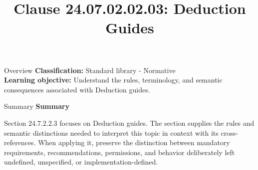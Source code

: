 \documentclass[10pt,letterpaper]{article}
\title{Clause 24.07.02.02.03: Deduction Guides}
\author{}
\date{}
\begin{document}
\maketitle
\begin{CornellOverviewBox}{Overview}
\textbf{Classification:} Standard library - Normative\\[2pt]
\textbf{Learning objective:} Understand the rules, terminology, and semantic consequences associated with Deduction guides.
\end{CornellOverviewBox}\begin{CornellSummaryBox}{Summary}
{\sffamily\bfseries\color{Accent} Summary}\par\vspace{3pt}Section 24.7.2.2.3 focuses on Deduction guides. The section supplies the rules and semantic distinctions needed to interpret this topic in context with its cross-references. When applying it, preserve the distinction between mandatory requirements, recommendations, permissions, and behavior deliberately left undefined, unspecified, or implementation-defined.
\end{CornellSummaryBox}
\end{document}

